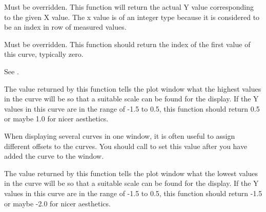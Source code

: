 Must be overridden. This function will return the actual Y value corresponding
to the given X value. The x value is of an integer type because it is considered
to be an index in row of measured values.

\label{wxplotcurvegetstartx}


Must be overridden. This function should return the index of the first value
of this curve, typically zero.

\label{wxplotcurvegetstarty}


See .

\label{wxplotcurvesetendy}


The value returned by this function tells the plot window what the highest values
in the curve will be so that a suitable scale can be found for the display. If
the Y values in this curve are in the range of -1.5 to 0.5, this function should
return 0.5 or maybe 1.0 for nicer aesthetics.

\label{wxplotcurvesetoffsety}


When displaying several curves in one window, it is often useful to assign
different offsets to the curves. You should call 
to set this value after you have added the curve to the window.

\label{wxplotcurvesetstarty}


The value returned by this function tells the plot window what the lowest values
in the curve will be so that a suitable scale can be found for the display. If
the Y values in this curve are in the range of -1.5 to 0.5, this function should
return -1.5 or maybe -2.0 for nicer aesthetics.

